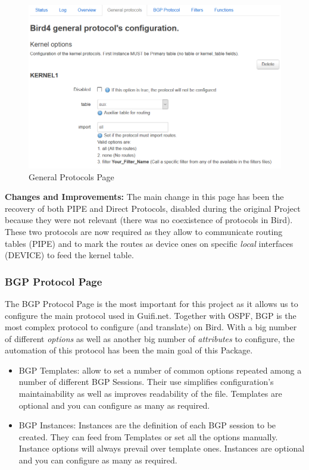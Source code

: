 \begin{figure}[H]
    \centering
    \includegraphics[width=\textwidth]{images/bird0.3/general}
    \caption{General Protocols Page}
    \label{fig:generalp}
\end{figure}

\textbf{Changes and Improvements:}
The main change in this page has been the recovery of both PIPE and Direct Protocols, disabled during the original Project because they were not relevant (there was no coexistence of protocols in Bird). 
These two protocols are now required as they allow to communicate routing tables (PIPE) and to mark the routes as device ones on specific \textit{local} interfaces (DEVICE) to feed the kernel table.

\subsubsection{BGP Protocol Page}
The BGP Protocol Page is the most important for this project as it allows us to configure the main protocol used in Guifi.net. Together with OSPF, BGP is the most complex protocol to configure (and translate) on Bird. With a big number of different \textit{options} as well as another big number of \textit{attributes} to configure, the automation of this protocol has been the main goal of this Package.

\begin{itemize}
    \item BGP Templates: allow to set a number of common options repeated among a number of  different BGP Sessions. Their use simplifies configuration's maintainability as well as improves readability of the file. Templates are optional and you can configure as many as required.
    \item BGP Instances: Instances are the definition of each BGP session to be created. They can feed from Templates or set all the options manually. Instance options will always prevail over template ones. Instances are optional and you can configure as many as required.
\end{itemize}

